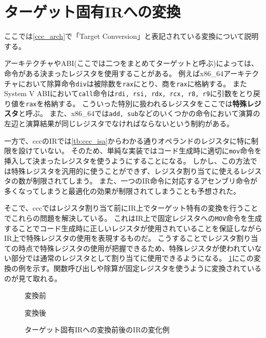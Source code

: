 \documentclass[uplatex,a4paper]{jsarticle}
\begin{document}
\clearpage
\section{ターゲット固有IRへの変換}
\label{archconv}

ここでは\cref{ccc_arch}で「Target Conversion」と表記されている変換について説明する。

アーキテクチャやABI(ここでは二つをまとめてターゲットと呼ぶ)によっては、命令がある決まったレジスタを使用することがある。
例えばx86\_64アーキテクチャ\cite{guide2011intel}において除算命令\texttt{div}は被除数を\texttt{rax}にとり、商を\texttt{rax}に格納する。
またSystem V ABI\cite{SystemV}において\texttt{call}命令は\texttt{rdi, rsi, rdx, rcx, r8, r9}に引数をとり戻り値を\texttt{rax}を格納する。
こういった特別に扱われるレジスタをここでは\textbf{特殊レジスタ}と呼ぶ。
また、x86\_64では\texttt{add, sub}などのいくつかの命令において演算の左辺と演算結果が同じレジスタでなければならないという制約がある。

一方で、cccのIRでは\cref{tb:ccc_isa}からわかる通りオペランドのレジスタに特に制限を設けていない。
そのため、単純な実装ではコード生成時に適切に\texttt{mov}命令を挿入して決まったレジスタを使うようにすることになる。
しかし、この方法では特殊レジスタを汎用的に使うことができず、レジスタ割り当てに使えるレジスタの数が制限されてしまう。
また、一つのIR命令に対応するアセンブリ命令が多くなってしまうと最適化の効果が制限されてしまうことも予想された。

そこで、cccではレジスタ割り当て前にIR上でターゲット特有の変換を行うことでこれらの問題を解決している。
これはIR上で固定レジスタへの\texttt{MOV}命令を生成することでコード生成時に正しいレジスタが使用されていることを保証しながらIR上で特殊レジスタの使用を表現するものだ。
こうすることでレジスタ割り当ての時点で特殊レジスタの使用が把握できるため、特殊レジスタが使われていない部分では通常のレジスタとして割り当てに使用できるようになる。
\cref{ccc_arch_fig}にこの変換の例を示す。関数呼び出しや除算が固定レジスタを使うように変換されているのが見て取れる。

\begin{figure}[h]
  \begin{minipage}{0.50\hsize}
    \centering
    
    \caption*{変換前}
  \end{minipage}
  \begin{minipage}{0.50\hsize}
    \centering
    
    \caption*{変換後}
  \end{minipage}
  \caption{ターゲット固有IRへの変換前後のIRの変化例}
  \label{ccc_arch_fig}
\end{figure}
\end{document}
